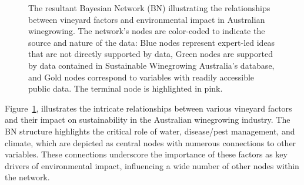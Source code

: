 
% 
\begin{figure}[h!]
    \centering
    \caption{The resultant Bayesian Network (BN) illustrating the relationships between vineyard factors and environmental impact in Australian winegrowing. The network's nodes are color-coded to indicate the source and nature of the data: Blue nodes represent expert-led ideas that are not directly supported by data, Green nodes are supported by data contained in Sustainable Winegrowing Australia's database, and Gold nodes correspond to variables with readily accessible public data. The terminal node is highlighted in pink.}\label{fig:generalBN}
\end{figure}


Figure~\ref{fig:generalBN}, illustrates the intricate relationships between various vineyard factors and their impact on sustainability in the Australian winegrowing industry. The BN structure highlights the critical role of water, disease/pest management, and climate, which are depicted as central nodes with numerous connections to other variables. These connections underscore the importance of these factors as key drivers of environmental impact, influencing a wide number of other nodes within the network.

